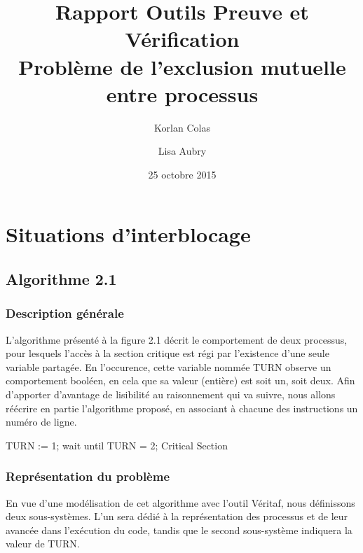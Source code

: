\documentclass[a4paper]{report}
\title{Rapport Outils Preuve et Vérification\\ \textbf{Problème de l'exclusion mutuelle entre processus}}
\author{Korlan Colas \and Lisa Aubry}
\date{25 octobre 2015}                       %
\begin{document}
\maketitle                    %


\tableofcontents              %

\chapter{Situations d'interblocage}                %

\section{Algorithme 2.1}               %

\subsection{Description générale}         %

L'algorithme présenté à la figure 2.1 décrit le comportement de deux processus, pour lesquels l'accès à la section critique est régi par l'existence d'une seule variable partagée.
En l'occurence, cette variable nommée TURN observe un comportement booléen, en cela que sa valeur (entière) est soit un, soit deux.
Afin d'apporter d'avantage de lisibilité au raisonnement qui va suivre, nous allons réécrire en partie l'algorithme proposé, en associant à chacune des instructions un numéro de ligne.


\begin{listing}[1]{1}
TURN := 1;
wait until TURN = 2;
Critical Section
\end{listing}

\subsection{Représentation du problème}         %

En vue d'une modélisation de cet algorithme avec l'outil Véritaf, nous définissons deux sous-systèmes.
L'un sera dédié à la représentation des processus et de leur avancée dans l'exécution du code, tandis que le second sous-système indiquera la valeur de TURN.
\end{document}
